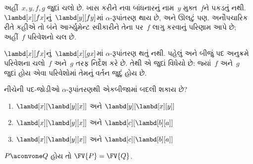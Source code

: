 \begin{ex}
  અહીં~$x,y,f,g$ જુદાં ચલો છે. ખાસ કરીને નવા બાંધનારનું
  નામ~$y$ મુક્ત~$f$ને પકડતું નથી.
  $\lambd[x][f x]$નું~$\lambd[y][f
  y]$માં $\alpha$-રૂપાંતરણ થાય છે, અને ઊલટું પણ.
  અનૌપચારિક રીતે કહીએ તો બંને આર્ગ્યુમેન્ટ સ્વીકારીને તેના
  પર~$f$ લાગુ કરવાનું પરિણામ આપે છે; અહીં~$f$ પરિવેશનો
  ચલ છે.

  $\lambd[x][f x]$નું~$\lambd[x][g
    x]$માં $\alpha$-રૂપાંતરણ થતું નથી. પહેલું અને બીજું પદ
  અનુક્રમે પરિવેશના ચલો~$f$ અને~$g$ તરફ નિર્દેશ કરે છે.
  તેથી એ જુદાં વિધેયો છે: જ્યાં~$f$ અને~$g$ જુદાં હોય એવા
  પરિવેશોમાં તેમનું વર્તન જુદું હોય છે.
\end{ex}

\begin{prob}
  નીચેની પદ-જોડીઓ $\alpha$-રૂપાંતરણથી એકબીજામાં બદલી શકાય છે?
  \begin{enumerate}
  \item $\lambd[x][\lambd[y][x]]$ અને $\lambd[y][\lambd[x][y]]$
  \item $\lambd[x][\lambd[y][x]]$ અને $\lambd[c][\lambd[b][a]]$
  \item $\lambd[x][\lambd[y][x]]$ અને $\lambd[c][\lambd[b][a]]$
  \end{enumerate}
\end{prob}

\begin{lem}
  $P \aconvone Q$ હોય તો $\FV{P} = \FV{Q}$.
\end{lem}

